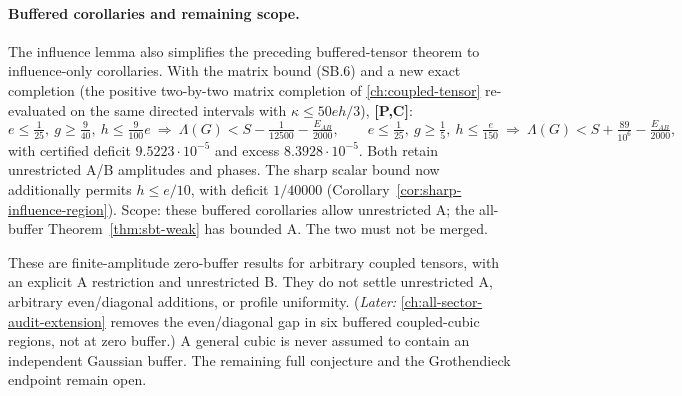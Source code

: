 \paragraph{Buffered corollaries and remaining scope.}
The influence lemma also simplifies the preceding buffered-tensor
theorem to influence-only corollaries. With the matrix bound (SB.6) and
a new exact completion (the positive two-by-two matrix completion of
\autoref{ch:coupled-tensor} re-evaluated on the same directed
intervals with \(\kappa\le50eh/3\)), \textbf{[P,C]}:
\[
 e\le\tfrac1{25},\ g\ge\tfrac9{40},\ h\le\tfrac9{100}e
 \ \Rightarrow\ \Lambda(G)<S-\tfrac1{12500}-\tfrac{E_{AB}}{2000},
 \qquad
 e\le\tfrac1{25},\ g\ge\tfrac15,\ h\le\tfrac e{150}
 \ \Rightarrow\ \Lambda(G)<S+\tfrac{89}{10^6}-\tfrac{E_{AB}}{2000},
\]
with certified deficit \(9.5223\cdot10^{-5}\) and excess
\(8.3928\cdot10^{-5}\). Both retain unrestricted A/B amplitudes and phases.
The sharp scalar bound now additionally permits $h\le e/10$, with deficit $1/40000$ (Corollary~\ref{cor:sharp-influence-region}). Scope: these buffered corollaries allow
unrestricted A; the all-buffer Theorem~\ref{thm:sbt-weak} has bounded A.
The two must not be merged.

These are finite-amplitude zero-buffer results for arbitrary coupled
tensors, with an explicit A restriction and unrestricted B.
They do not settle unrestricted A, arbitrary even/diagonal additions,
or profile uniformity. (\emph{Later:} \autoref{ch:all-sector-audit-extension} removes the even/diagonal gap in six buffered coupled-cubic regions, not at zero buffer.) A general cubic is never assumed to contain
an independent Gaussian buffer. The remaining full conjecture and
the Grothendieck endpoint remain open.
